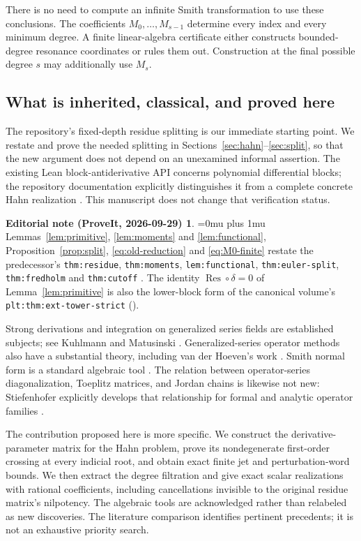 \documentclass[11pt,a4paper]{article}
\numberwithin{equation}{section}
\theoremstyle{definition}
\theoremstyle{remark}
\theoremstyle{definition}
\newtheorem*{ednoteinner}{Editorial note (ProveIt, 2026-09-29)}
\newenvironment{ednote}{\begin{ednoteinner}\sloppy\Urlmuskip=0mu plus 1mu\relax}{\end{ednoteinner}}
\newcommand{\Res}{\operatorname{Res}}
\begin{document}
There is no need to compute an infinite Smith transformation to use these conclusions. The coefficients $M_0,\ldots,M_{s-1}$ determine every index and every minimum degree. A finite linear-algebra certificate either constructs bounded-degree resonance coordinates or rules them out. Construction at the final possible degree $s$ may additionally use $M_s$.

\subsection{What is inherited, classical, and proved here}
The repository's fixed-depth residue splitting is our immediate starting point. We restate and prove the needed splitting in Sections~\ref{sec:hahn}--\ref{sec:split}, so that the new argument does not depend on an unexamined informal assertion. The existing Lean block-antiderivative API concerns polynomial differential blocks; the repository documentation explicitly distinguishes it from a complete concrete Hahn realization \cite{repo-docs,repo-block}. This manuscript does not change that verification status.
\begin{ednote}
Lemmas~\ref{lem:primitive}, \ref{lem:moments} and \ref{lem:functional}, Proposition~\ref{prop:split}, \eqref{eq:old-reduction} and \eqref{eq:M0-finite} restate the predecessor's \texttt{thm:residue}, \texttt{thm:moments}, \texttt{lem:functional}, \texttt{thm:euler-split}, \texttt{thm:fredholm} and \texttt{thm:cutoff} \cite{repo-residue}. The identity $\Res\circ\delta=0$ of Lemma~\ref{lem:primitive} is also the lower-block form of the canonical volume's \texttt{plt:thm:ext-tower-strict} ().
\end{ednote}

Strong derivations and integration on generalized series fields are established subjects; see Kuhlmann and Matusinski \cite{km}. Generalized-series operator methods also have a substantial theory, including van der Hoeven's work \cite{vdh}. Smith normal form is a standard algebraic tool \cite{stanley}. The relation between operator-series diagonalization, Toeplitz matrices, and Jordan chains is likewise not new: Stiefenhofer explicitly develops that relationship for formal and analytic operator families \cite{stiefenhofer}.

The contribution proposed here is more specific. We construct the derivative-parameter matrix for the Hahn problem, prove its nondegenerate first-order crossing at every indicial root, and obtain exact finite jet and perturbation-word bounds. We then extract the degree filtration and give exact scalar realizations with rational coefficients, including cancellations invisible to the original residue matrix's nilpotency. The algebraic tools are acknowledged rather than relabeled as new discoveries. The literature comparison identifies pertinent precedents; it is not an exhaustive priority search.
\end{document}
